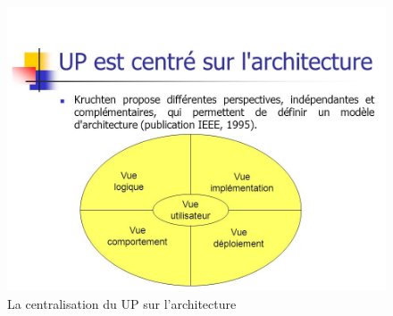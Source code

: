 \documentclass[12 pt ]{report}
\begin{document}
\begin{itemize}[font=\color{black} \Large, label=]
\begin{figure}[h]
\begin{center}
\includegraphics[scale=0.5]{u.jpg}
\caption{ La centralisation du UP sur l'architecture}
\end{center}
\end{figure}



\end{itemize}
\end{document}
